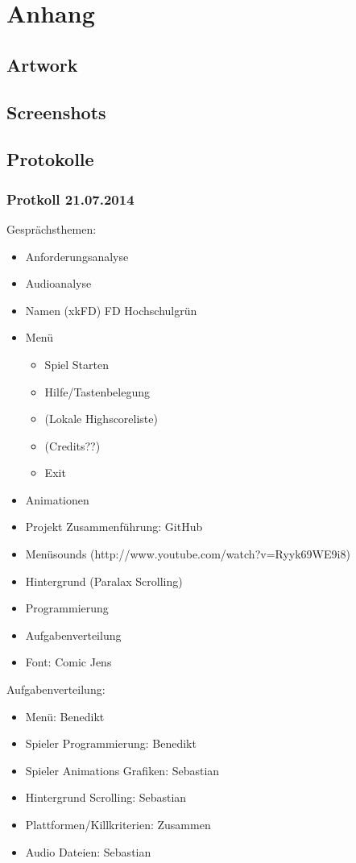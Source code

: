 \documentclass[Skript.tex]{subfiles}
\begin{document}
\newpage
\appendix 
\section{Anhang}

\subsection{Artwork}

\subsection{Screenshots}

\subsection{Protokolle}

\subsubsection*{Protkoll 21.07.2014}

Gesprächsthemen:

\begin{itemize}
\item Anforderungsanalyse
\item Audioanalyse 
\item Namen (xkFD) FD Hochschulgrün
\item Menü
	\begin{itemize}
	\item Spiel Starten
	\item Hilfe/Tastenbelegung
	\item (Lokale Highscoreliste)
	\item (Credits??)
	\item Exit
	\end{itemize}
\item Animationen
\item Projekt Zusammenführung: GitHub
\item Menüsounds (http://www.youtube.com/watch?v=Ryyk69WE9i8)
\item Hintergrund (Paralax Scrolling)
\item Programmierung
\item Aufgabenverteilung
\item Font: Comic Jens
\end{itemize}


Aufgabenverteilung:

\begin{itemize}
\item Menü: Benedikt
\item Spieler Programmierung: Benedikt
\item Spieler Animations Grafiken:  Sebastian
\item Hintergrund Scrolling: Sebastian
\item Plattformen/Killkriterien: Zusammen
\item Audio Dateien: Sebastian



\end{itemize}
\end{document}
